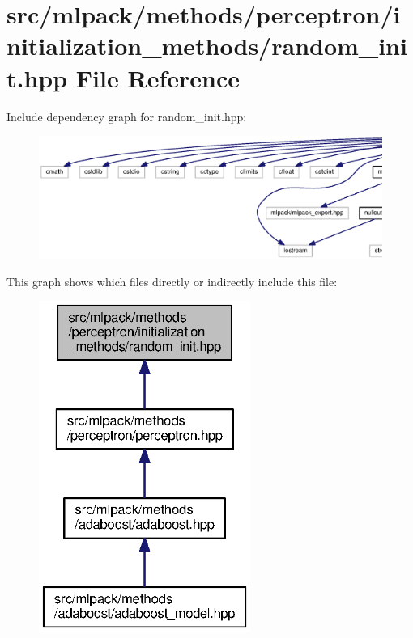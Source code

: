 \section{src/mlpack/methods/perceptron/initialization\+\_\+methods/random\+\_\+init.hpp File Reference}
\label{perceptron_2initialization__methods_2random__init_8hpp}
Include dependency graph for random\+\_\+init.\+hpp\+:
\nopagebreak
\begin{figure}[H]
\begin{center}
\leavevmode
\includegraphics[width=350pt]{perceptron_2initialization__methods_2random__init_8hpp__incl}
\end{center}
\end{figure}
This graph shows which files directly or indirectly include this file\+:
\nopagebreak
\begin{figure}[H]
\begin{center}
\leavevmode
\includegraphics[width=196pt]{perceptron_2initialization__methods_2random__init_8hpp__dep__incl}
\end{center}
\end{figure}
